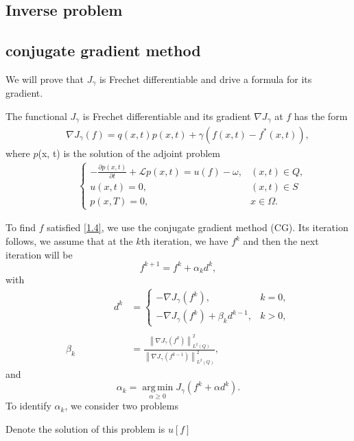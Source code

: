 \documentclass[notitlepage,a4paper,fleqn,9pt]{icmfarticle}
\begin{document}
\begin{multicols}{2}
\section{Inverse problem}
\subsection{conjugate gradient method}
We will prove that $J_\gamma$ is Frechet differentiable and drive a formula for its gradient.
\begin{dl}
	The functional $J_\gamma$ is Frechet differentiable and its gradient $\nabla J_\gamma$ at $f$ has the form 
	\begin{align}\label{2.6}
		\qquad \nabla J_\gamma(f)=q(x, t)p(x, t)+\gamma \left(f(x, t)-f^*(x, t)\right),
	\end{align}
	where $p$(x, t) is the solution of the adjoint problem
	\begin{align}\label{2.5} 
		\qquad\quad\begin{cases}
		-\frac{\partial p(x, t)}{\partial t}+\mathcal{L}p(x, t)=u(f)-\omega, & (x, t)\in Q,\\
		u(x, t)=0, & (x, t)\in S\\
		p(x, T)=0, & x\in \Omega.
		\end{cases}
	\end{align}
\end{dl}
\noindent To find $f$ satisfied \eqref{1.4}, we use the conjugate gradient method (CG). Its iteration follows, we assume that at the $k$th iteration, we have $f^k$ and then the next iteration will be
$$f^{k+1}=f^k+\alpha_kd^k,$$
with
\begin{align*}
	\qquad\qquad\quad d^k&=\left\{\begin{array}{ll}
	-\nabla J_\gamma(f^k),& k=0,\\
	-\nabla J_\gamma(f^k)+\beta_kd^{k-1},& k>0,
	\end{array}\right.\\\\
	\beta_k&=\frac{\left\|\nabla J_\gamma (f^k)\right\|^2_{L^2(Q)}}{\left\|\nabla J_\gamma (f^{k-1})\right\|^2_{L^2(Q)}},
\end{align*}
and
$$\alpha_k=\operatorname*{arg\,min}_{\alpha\geq 0}J_\gamma(f^k+\alpha d^k).$$
To identify $\alpha_k$, we consider two problems
\begin{bt}\label{bt2.1}
	Denote the solution of this problem is $u[f]$

\end{bt}
\end{multicols}
\end{document}
